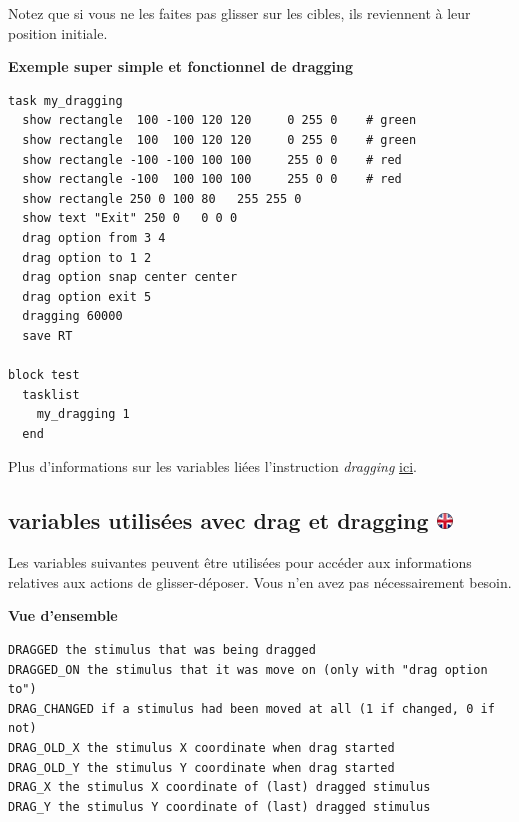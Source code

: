 \documentclass[
]{book}
\begin{document}
Notez que si vous ne les faites pas glisser sur les cibles, ils reviennent à leur position initiale.

\textbf{Exemple super simple et fonctionnel de dragging}

\begin{verbatim}
task my_dragging
  show rectangle  100 -100 120 120     0 255 0    # green
  show rectangle  100  100 120 120     0 255 0    # green
  show rectangle -100 -100 100 100     255 0 0    # red
  show rectangle -100  100 100 100     255 0 0    # red
  show rectangle 250 0 100 80   255 255 0
  show text "Exit" 250 0   0 0 0
  drag option from 3 4
  drag option to 1 2
  drag option snap center center
  drag option exit 5
  dragging 60000
  save RT

block test
  tasklist
    my_dragging 1
  end
\end{verbatim}

Plus d'informations sur les variables liées l'instruction \emph{dragging} \protect\hyperlink{drag-variables}{ici}.

\hypertarget{variables-utilisuxe9es-avec-drag-et-dragging}{%
\subsection[variables utilisées avec drag et dragging ]{\texorpdfstring{variables utilisées avec drag et dragging \href{https://www.psytoolkit.org/doc3.4.0/syntax.html\#drag-variables}{\protect\includegraphics{img/ukflag.png}}}{variables utilisées avec drag et dragging }}\label{variables-utilisuxe9es-avec-drag-et-dragging}}

Les variables suivantes peuvent être utilisées pour accéder aux informations relatives aux actions de glisser-déposer. Vous n'en avez pas nécessairement besoin.

\textbf{Vue d'ensemble}

\begin{verbatim}
DRAGGED the stimulus that was being dragged
DRAGGED_ON the stimulus that it was move on (only with "drag option to")
DRAG_CHANGED if a stimulus had been moved at all (1 if changed, 0 if not)
DRAG_OLD_X the stimulus X coordinate when drag started
DRAG_OLD_Y the stimulus Y coordinate when drag started
DRAG_X the stimulus X coordinate of (last) dragged stimulus
DRAG_Y the stimulus Y coordinate of (last) dragged stimulus
\end{verbatim}
\end{document}
